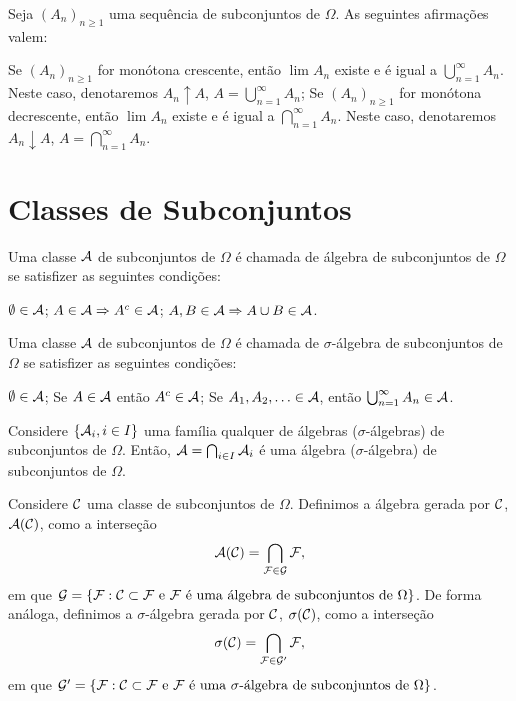 \begin{theorem}
	Seja $(A_n)_{n\geq 1}$ uma sequência de subconjuntos de $\Omega$. As seguintes afirmações valem:
	\begin{outline}[enumerate]
		\1 Se $(A_n)_{n\geq 1}$ for monótona crescente, então $\lim A_n$ existe e é igual a $\bigcup_{n=1}^{\infty} A_n$. Neste caso, denotaremos $A_n \uparrow A$, $A = \bigcup_{n=1}^{\infty} A_n$;
		\1 Se $(A_n)_{n\geq 1}$ for monótona decrescente, então $\lim A_n$ existe e é igual a $\bigcap_{n=1}^{\infty} A_n$. Neste caso, denotaremos $A_n \downarrow A$, $A = \bigcap_{n=1}^{\infty} A_n$.
	\end{outline}
\end{theorem}

\section{Classes de Subconjuntos}

\begin{definition}[Álgebra]
	Uma classe $\mathcal{A}$ de subconjuntos de $\Omega$ é chamada de álgebra de subconjuntos de $\Omega$ se satisfizer as seguintes condições:
	\begin{outline}[enumerate]
		\1 $\emptyset \in \mathcal{A}$;
		\1 $A \in \mathcal{A} \Rightarrow A^c \in \mathcal{A}$;
		\1 $A, B \in \mathcal{A} \Rightarrow A \cup B \in \mathcal{A}$.
	\end{outline}
\end{definition}

\begin{definition}
	Uma classe $\mathcal{A}$ de subconjuntos de $\Omega$ é chamada de $\sigma$-álgebra de subconjuntos de $\Omega$ se satisfizer as seguintes condições:
	\begin{outline}[enumerate]
		\1 $\emptyset \in \mathcal{A}$;
		\1 Se $A \in \mathcal{A}$ então $A^c \in \mathcal{A}$;
		\1 Se $A_1, A_2, \ldots \in \mathcal{A}$, então $\bigcup_{n=1}^{\infty} A_n \in \mathcal{A}$.
	\end{outline}
\end{definition}

\begin{theorem}
	Considere $\{\mathcal{A}_i, i \in I\}$ uma família qualquer de álgebras ($\sigma$-álgebras) de subconjuntos de $\Omega$. Então, $\mathcal{A} = \bigcap_{i \in I} \mathcal{A}_i$ é uma álgebra ($\sigma$-álgebra) de subconjuntos de $\Omega$.
\end{theorem}

\begin{definition}
	Considere $\mathcal{C}$ uma classe de subconjuntos de $\Omega$. Definimos a álgebra gerada por $\mathcal{C}$, $\mathcal{A}(\mathcal{C})$, como a interseção
	\[
	\mathcal{A}(\mathcal{C}) = \bigcap_{\mathcal{F} \in \mathcal{G}} \mathcal{F},
	\]
	em que $\mathcal{G} = \{\mathcal{F} : \mathcal{C} \subset \mathcal{F} \text{ e } \mathcal{F} \text{ é uma álgebra de subconjuntos de } \Omega\}$. De forma análoga, definimos a $\sigma$-álgebra gerada por $\mathcal{C}$, $\sigma(\mathcal{C})$, como a interseção
	\[
	\sigma(\mathcal{C}) = \bigcap_{\mathcal{F} \in \mathcal{G}'} \mathcal{F},
	\]
	em que $\mathcal{G}' = \{\mathcal{F} : \mathcal{C} \subset \mathcal{F} \text{ e } \mathcal{F} \text{ é uma } \sigma\text{-álgebra de subconjuntos de } \Omega\}$.
\end{definition}

